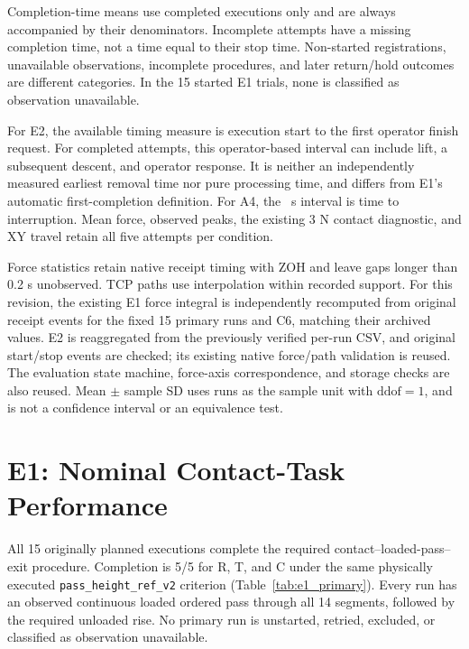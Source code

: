 Completion-time means use completed executions only and are always accompanied by their denominators. Incomplete attempts have a missing completion time, not a time equal to their stop time. Non-started registrations, unavailable observations, incomplete procedures, and later return/hold outcomes are different categories. In the 15 started E1 trials, none is classified as observation unavailable.

For E2, the available timing measure is execution start to the first operator finish request. For completed attempts, this operator-based interval can include lift, a subsequent descent, and operator response. It is neither an independently measured earliest removal time nor pure processing time, and differs from E1's automatic first-completion definition. For A4, the \AfourInterval~s interval is time to interruption. Mean force, observed peaks, the existing 3 N contact diagnostic, and XY travel retain all five attempts per condition.

Force statistics retain native receipt timing with ZOH and leave gaps longer than 0.2 s unobserved. TCP paths use interpolation within recorded support. For this revision, the existing E1 force integral is independently recomputed from original receipt events for the fixed 15 primary runs and C6, matching their archived values. E2 is reaggregated from the previously verified per-run CSV, and original start/stop events are checked; its existing native force/path validation is reused. The evaluation state machine, force-axis correspondence, and storage checks are also reused. Mean \(\pm\) sample SD uses runs as the sample unit with \(\mathrm{ddof}=1\), and is not a confidence interval or an equivalence test.

\section{E1: Nominal Contact-Task Performance}
All 15 originally planned executions complete the required contact--loaded-pass--exit procedure. Completion is 5/5 for R, T, and C under the same physically executed \texttt{pass\_height\_ref\_v2} criterion (Table~\ref{tab:e1_primary}). Every run has an observed continuous loaded ordered pass through all 14 segments, followed by the required unloaded rise. No primary run is unstarted, retried, excluded, or classified as observation unavailable.

\begin{table}[tbp]\centering\small
\caption[E1 primary nominal results]{Primary E1 nominal development results, 15 October 2026. The original five runs per method, including C5, are retained. Time and excess-force exposure are mean \(\pm\) sample SD, with \(n=5\) in every cell. C6 is excluded from these statistics.}
\label{tab:e1_primary}

\end{table}

